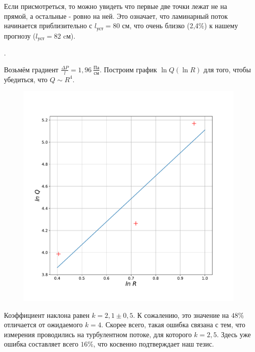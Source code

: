 \documentclass[a4paper, 12pt]{article}
\newcounter{Points}
\newcommand{\point}{\arabic{Points}. \addtocounter{Points}{1}}
\begin{document}
Если присмотреться, то можно увидеть что первые две точки лежат не на прямой, а остальные - ровно на ней. Это означает, что ламинарный поток начинается приблизительно с $l_{уст} = 80$ см, что очень близко (2,4\%) к нашему прогнозу ($l_{уст} = 82$ cм).

\point Возьмём градиент $\displaystyle \frac{\Delta P}{l} = 1,96 ~\frac{Па}{см}$. Построим график $\ln Q (\ln R)$ для того, чтобы убедиться, что $Q \sim R^4$.

\begin{figure}[!h]
    \centering
    \includegraphics[scale = 0.4]{QR.pdf}
\end{figure}

Коэффициент наклона равен $k = 2,1 \pm 0,5$. К сожалению, это значение на $48\%$ отличается от ожидаемого $k = 4$. Скорее всего, такая ошибка связана с тем, что измерения проводились на турбулентном потоке, для которого $k = 2,5$. Здесь уже ошибка составляет всего $16\%$, что косвенно подтверждает наш тезис.
\end{document}
